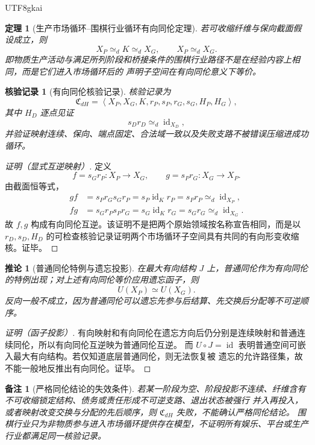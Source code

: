 \documentclass[12pt,a4paper,openany]{report}
\newtheorem{theorem}{定理}[chapter]
\newtheorem{corollary}{推论}[chapter]
\newtheorem{remark}{备注}[chapter]
\newtheorem{Certificate}{核验记录}[chapter]
\newcommand{\Tuple}[1]{\left\langle #1\right\rangle}
\begin{document}
\begin{CJK*}{UTF8}{gkai}
\begin{theorem}[生产市场循环--围棋行业循环有向同伦定理]
\label{thm:production-go-directed-homotopy}
若可收缩纤维与保向截面假设成立，则
\[
  X_P\simeq_d K\simeq_d X_G,
  \qquad
  X_P\simeq_d X_G.
\]
即物质生产活动与满足所列阶段和桥接条件的围棋行业路径不是在经验内容上相同，而是它们进入市场循环后的
声明子空间在有向同伦意义下等价。
\end{theorem}

\begin{Certificate}[有向同伦核验记录]
核验记录为
\[
  \mathfrak C_{dH}
  =\Tuple{X_P,X_G,K,r_P,s_P,r_G,s_G,H_P,H_G},
\]
其中 \(H_D\) 逐点见证
\[
  s_Dr_D\simeq_d\operatorname{id}_{X_D},
\]
并验证映射连续、保向、端点固定、合法域一致以及失败支路不被错误压缩进成功循环。
\end{Certificate}

\begin{proof}[证明（显式互逆映射）]
定义
\[
  f=s_Gr_P:X_P\to X_G,
  \qquad
  g=s_Pr_G:X_G\to X_P.
\]
由截面恒等式，
\[
\begin{aligned}
  gf
  &=s_Pr_Gs_Gr_P
  =s_P\operatorname{id}_Kr_P
  =s_Pr_P
  \simeq_d\operatorname{id}_{X_P},\\
  fg
  &=s_Gr_Ps_Pr_G
  =s_G\operatorname{id}_Kr_G
  =s_Gr_G
  \simeq_d\operatorname{id}_{X_G}.
\end{aligned}
\]
故 \(f,g\) 构成有向同伦互逆。该证明不是把两个原始领域按名称宣告相同，而是以
\(r_D,s_D,H_D\) 的可检查核验记录证明两个市场循环子空间具有共同的有向形变收缩核。证毕。
\end{proof}

\begin{corollary}[普通同伦特例与遗忘投影]
\label{cor:ordinary-homotopy-projection}
在最大有向结构 \(J\) 上，普通同伦作为有向同伦的特例出现；对上述有向同伦等价应用遗忘函子，则
\[
  U(X_P)\simeq U(X_G).
\]
反向一般不成立，因为普通同伦可以遗忘先参与后结算、先交换后分配等不可逆顺序。
\end{corollary}

\begin{proof}[证明（函子投影）]
有向映射和有向同伦在遗忘方向后仍分别是连续映射和普通连续同伦，所以有向同伦互逆映为普通同伦互逆。
而 \(U\circ J=\operatorname{id}\) 表明普通空间可嵌入最大有向结构。若仅知道底层普通同伦，则无法恢复被
遗忘的允许路径集，故不能一般地反推出有向同伦。证毕。
\end{proof}

\begin{remark}[严格同伦结论的失效条件]
若某一阶段为空、阶段投影不连续、纤维含有不可收缩锁定结构、债务或责任形成不可逆支路、退出状态被强行
并入再投入，或者映射改变交换与分配的先后顺序，则 \(\mathfrak C_{dH}\) 失败，不能确认严格同伦结论。
围棋行业只为非物质参与进入市场循环提供存在模型，不证明所有娱乐、平台或生产行业都满足同一核验记录。
\end{remark}


\end{CJK*}
\end{document}
